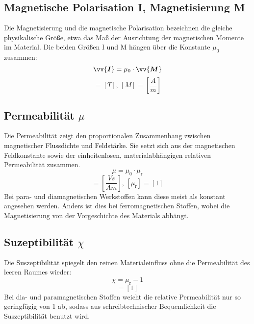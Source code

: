 \documentclass[a4paper,twoside,12pt,DIV=13,BCOR=5mm,numbers=noenddot,cleardoublepage=empty]{scrbook}
\begin{document}
        \subsection{Magnetische Polarisation I, Magnetisierung M}
        Die Magnetisierung und die magnetische Polarisation bezeichnen die gleiche 
        physikalische Gr\"o\ss{}e, etwa das Ma\ss{} der Ausrichtung der magnetischen Momente 
        im Material. Die beiden Gr\"o\ss{}en I und M h\"angen \"uber die Konstante 
        $\mu_\mathrm{0}$ zusammen:
        \begin{equation}
            \vv{\bm{I}}=\mu_\mathrm{0} \cdot \vv{\bm{M}}
        \end{equation}
        \begin{equation}
            [I]=[T],\,[M]=[\frac{A}{m}]
        \end{equation}
        \subsection{Permeabilit\"at $\mu$}
        Die Permeabilit\"at zeigt den proportionalen Zusammenhang zwischen 
        magnetischer Flussdichte und Feldst\"arke. Sie setzt sich aus der 
        magnetischen Feldkonstante sowie der einheitenlosen, materialabh\"angigen 
        relativen Permeabilit\"at zusammen.
        \begin{equation}
            \mu=\mu_\mathrm{0} \cdot \mu_\mathrm{r}
        \end{equation}
        \begin{equation}
            [\mu_\mathrm{0}]=[\frac{Vs}{Am}],\,[\mu_\mathrm{r}]=[1]
        \end{equation}
        Bei para- und diamagnetischen Werkstoffen kann diese meist als konstant 
        angesehen werden. Anders ist dies bei ferromagnetischen Stoffen, wobei die 
        Magnetisierung von der Vorgeschichte des Materials abh\"angt.
        \subsection{Suzeptibilit\"at $\chi$}
        Die Suszeptibilit\"at spiegelt den reinen Materialeinfluss ohne die 
        Permeabilit\"at des leeren Raumes wieder:
        \begin{equation}
            \chi=\mu_\mathrm{r}-1
        \end{equation}
        \begin{equation}
            [\chi]=[1]
        \end{equation}
        Bei dia- und paramagnetischen Stoffen weicht die relative Permeabilit\"at 
        nur so geringf\"ugig von 1 ab, sodass aus schreibtechnischer Bequemlichkeit 
        die Suszeptibilit\"at benutzt wird.
\end{document}
